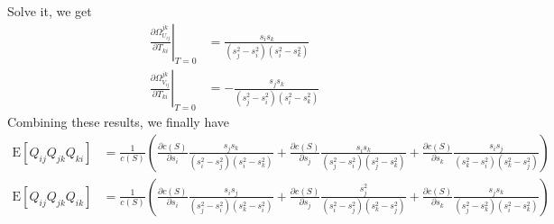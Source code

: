 \documentclass[10pt]{article}
\newcommand{\expect}[1]{\ensuremath{\mathrm{E}\left[ #1 \right]}}
\begin{document}
Solve it, we get
\begin{align}
	\left. \frac{\partial \Omega_{U_{ij}}^{jk}}{\partial T_{ki}} \right|_{T=0} &= \frac{s_is_k}{(s_j^2-s_i^2)(s_i^2-s_k^2)} \nonumber \\
	\left. \frac{\partial \Omega_{V_{ij}}^{jk}}{\partial T_{ki}} \right|_{T=0} &=
	-\frac{s_js_k}{(s_j^2-s_i^2)(s_i^2-s_k^2)}
\end{align}
Combining these results, we finally have
\begin{align}
	\expect{Q_{ij}Q_{jk}Q_{ki}} &= \frac{1}{c(S)}\left( \frac{\partial c(S)}{\partial s_i} \frac{s_js_k}{(s_i^2-s_j^2)(s_i^2-s_k^2)} + \frac{\partial c(S)}{\partial s_j} \frac{s_is_k}{(s_j^2-s_i^2)(s_j^2-s_k^2)} + \frac{\partial c(S)}{\partial s_k} \frac{s_is_j}{(s_k^2-s_i^2)(s_k^2-s_j^2)} \right) \nonumber \\
	\expect{Q_{ij}Q_{jk}Q_{ik}} &= \frac{1}{c(S)}\left( \frac{\partial c(S)}{\partial s_i} \frac{s_is_j}{(s_j^2-s_i^2)(s_k^2-s_i^2)} + \frac{\partial c(S)}{\partial s_j} \frac{s_j^2}{(s_i^2-s_j^2)(s_k^2-s_j^2)} + \frac{\partial c(S)}{\partial s_k} \frac{s_js_k}{(s_j^2-s_k^2)(s_i^2-s_k^2)} \right) \nonumber \\
\end{align}
\end{document}
